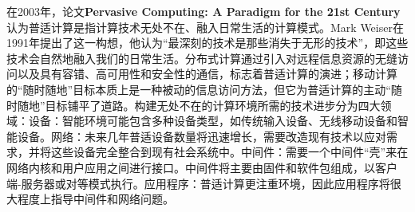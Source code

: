 \documentclass[a4paper,twoside]{scrbook}
\begin{document}
在2003年，论文\textbf{Pervasive Computing: A Paradigm for the 21st Century}认为普适计算是指计算技术无处不在、融入日常生活的计算模式。Mark Weiser在1991年提出了这一构想，他认为“最深刻的技术是那些消失于无形的技术”，即这些技术会自然地融入我们的日常生活。分布式计算通过引入对远程信息资源的无缝访问以及具有容错、高可用性和安全性的通信，标志着普适计算的演进；移动计算的“随时随地”目标本质上是一种被动的信息访问方法，但它为普适计算的主动“随时随地”目标铺平了道路。构建无处不在的计算环境所需的技术进步分为四大领域：设备：智能环境可能包含多种设备类型，如传统输入设备、无线移动设备和智能设备。网络：未来几年普适设备数量将迅速增长，需要改造现有技术以应对需求，并将这些设备完全整合到现有社会系统中。中间件：需要一个中间件“壳”来在网络内核和用户应用之间进行接口。中间件将主要由固件和软件包组成，以客户端-服务器或对等模式执行。应用程序：普适计算更注重环境，因此应用程序将很大程度上指导中间件和网络问题。
\end{document}
